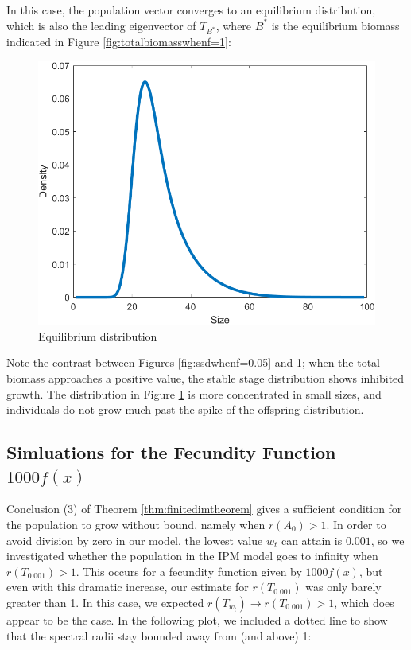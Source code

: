 In this case, the population vector converges to an equilibrium distribution, which is also the leading eigenvector of $T_{B^*}$, where $B^*$ is the equilibrium biomass indicated in Figure \ref{fig:totalbiomasswhenf=1}:

\begin{figure}[H]
	\centering
	\includegraphics[width=0.7\linewidth]{Images/F=1/ssd_when_f=1}
	\caption{Equilibrium distribution}
	\label{fig:ssdwhenf=1}
\end{figure}

Note the contrast between Figures \ref{fig:ssdwhenf=0.05} and \ref{fig:ssdwhenf=1}; when the total biomass approaches a positive value, the stable stage distribution shows inhibited growth. The distribution in Figure \ref{fig:ssdwhenf=1} is more concentrated in small sizes, and individuals do not grow much past the spike of the offspring distribution.

\subsection{Simluations for the Fecundity Function $1000f(x)$} \label{subsec:1000f(x)}

Conclusion (3) of Theorem \ref{thm:finitedimtheorem} gives a sufficient condition for the population to grow without bound, namely when $r(A_0) >1$. In order to avoid division by zero in our model, the lowest value $w_t$ can attain is $0.001$, so we investigated whether the population in the IPM model goes to infinity when $r(T_{0.001}) > 1$. This occurs for a fecundity function given by $1000f(x)$, but even with this dramatic increase, our estimate for $r(T_{0.001})$ was only barely greater than 1. In this case, we expected $r(T_{w_t}) \to r(T_{0.001}) > 1$, which does appear to be the case. In the following plot, we included a dotted line to show that the spectral radii stay bounded away from (and above) 1:

